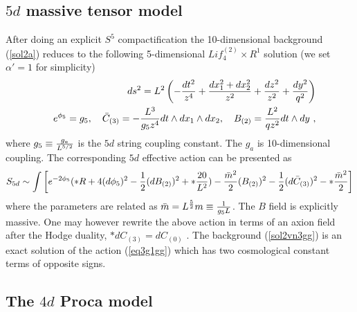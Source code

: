 \documentclass[12pt]{article}
\def\bea{\begin{eqnarray}} \def\eea{\end{eqnarray}} \def\ba{\begin{array}}
\newcommand{\eqn}[1]{(\ref{#1})}
\def\br{\nonumber\\}
\begin{document}
\subsection{$5d$ massive tensor model}

After doing an explicit $S^5$ 
 compactification the 10-dimensional background  \eqn{sol2a}
reduces to the following 5-dimensional 
$Lif_4^{(2)}\times R^1$ solution (we set $\alpha'=1$ for simplicity)
\bea\label{sol2vn3gg}
&&ds^2={L}^2\left(- {dt^2\over  z^4} +{dx_1^2+dx_2^2 \over z^2}+{dz^2\over
z^2} +{dy^2\over q^2}\right)    \br
&& e^{\phi_5}= g_5,~~~
 {\bar{C}}_{(3)}=  -{{L^3}\over  g_5 z^4}dt\wedge dx_1\wedge dx_2, ~~~
 {{B}}_{(2)}=  {{L^2}\over  qz^2}dt\wedge dy  \ ,
\eea
where 
${g}_5\equiv {g_a\over L^{5/2}}$ is 
 the  $5d$ string coupling constant. The $g_a$ is 10-dimensional coupling.
The corresponding $5d$ effective action can be presented as
\bea\label{eq3g1gg}
S_{5d}\sim\int\bigg[  e^{-2\phi_5}( \ast R +4(d\phi_5)^2   
-{ 1\over 2}(dB_{(2)})^2 +\ast{20\over L^2}) 
- {{\bar{m}}^2 \over 2}(B_{(2)})^2  
- { 1\over 2}(d{\bar{C}}_{(3)})^2  
-\ast{\bar{m}^2\over2}    
\bigg]  
\eea
where the parameters are related as $\bar{m}
=L^{5\over 2} m
\equiv {1\over g_5 L}$. The $B$ field is  explicitly massive. 
One may however rewrite the above action in terms of an 
axion field after the Hodge duality, $\ast dC_{(3)}= d C_{(0)}$ . 
The background \eqn{sol2vn3gg} is an exact  solution of 
the action \eqn{eq3g1gg} which has two cosmological constant terms
of opposite signs.


\subsection{The $4d$ Proca model}
\end{document}
